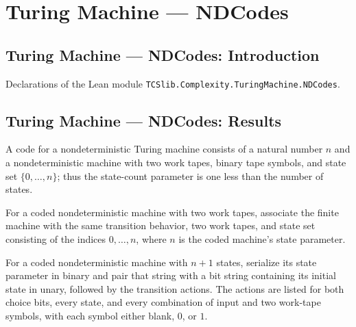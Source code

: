 \section{Turing Machine --- NDCodes}
\subsection*{Turing Machine --- NDCodes: Introduction}

Declarations of the Lean module \texttt{TCSlib.Complexity.TuringMachine.NDCodes}.

\subsection*{Turing Machine --- NDCodes: Results}

\begin{definition}
\label{Turing.CodeNDTM}
\leanok
{}
A code for a nondeterministic Turing machine consists of a natural number $n$ and a
nondeterministic machine with two work tapes, binary tape symbols, and state set
$\{0,\ldots,n\}$; thus the state-count parameter is one less than the number of states.
\end{definition}

\begin{definition}
\label{Turing.CodeNDTM.toFinNDTM}
\leanok
{}
For a coded nondeterministic machine with two work tapes, associate the finite machine
with the same transition behavior, two work tapes, and state set consisting of the
indices $0,\ldots,n$, where $n$ is the coded machine’s state parameter.
\end{definition}

\begin{definition}
\label{Turing.CodeNDTM.serialize}
\leanok
{}
For a coded nondeterministic machine with $n+1$ states, serialize its state parameter in
binary and pair that string with a bit string containing its initial state in unary,
followed by the transition actions. The actions are listed for both choice bits, every
state, and every combination of input and two work-tape symbols, with each symbol either
blank, $0$, or $1$.
\end{definition}

